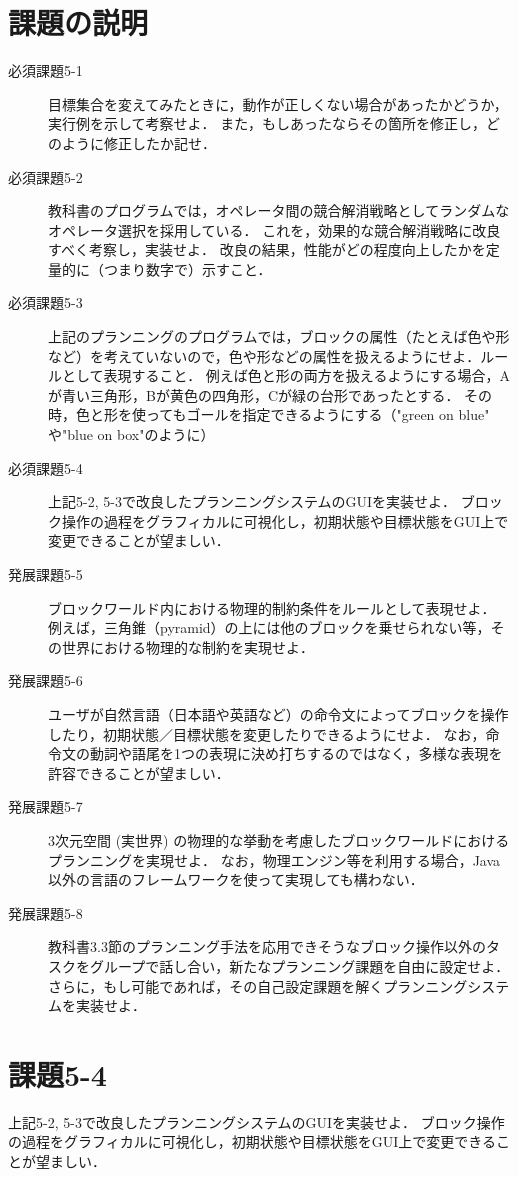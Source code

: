 \documentclass{jarticle}
\begin{document}
\section{課題の説明}
\begin{description}
    \item[必須課題5-1] 目標集合を変えてみたときに，動作が正しくない場合があったかどうか，実行例を示して考察せよ．
    また，もしあったならその箇所を修正し，どのように修正したか記せ．
    \item[必須課題5-2] 教科書のプログラムでは，オペレータ間の競合解消戦略としてランダムなオペレータ選択を採用している．
    これを，効果的な競合解消戦略に改良すべく考察し，実装せよ．
    改良の結果，性能がどの程度向上したかを定量的に（つまり数字で）示すこと．
    \item[必須課題5-3] 上記のプランニングのプログラムでは，ブロックの属性（たとえば色や形など）を考えていないので，色や形などの属性を扱えるようにせよ．ルールとして表現すること．
    例えば色と形の両方を扱えるようにする場合，Aが青い三角形，Bが黄色の四角形，Cが緑の台形であったとする．
    その時，色と形を使ってもゴールを指定できるようにする（"green on blue" や"blue on box"のように）
    \item[必須課題5-4] 上記5-2, 5-3で改良したプランニングシステムのGUIを実装せよ．
    ブロック操作の過程をグラフィカルに可視化し，初期状態や目標状態をGUI上で変更できることが望ましい．
    \item[発展課題5-5] ブロックワールド内における物理的制約条件をルールとして表現せよ．
    例えば，三角錐（pyramid）の上には他のブロックを乗せられない等，その世界における物理的な制約を実現せよ．
    \item[発展課題5-6] ユーザが自然言語（日本語や英語など）の命令文によってブロックを操作したり，初期状態／目標状態を変更したりできるようにせよ．
    なお，命令文の動詞や語尾を1つの表現に決め打ちするのではなく，多様な表現を許容できることが望ましい．
    \item[発展課題5-7] 3次元空間 (実世界) の物理的な挙動を考慮したブロックワールドにおけるプランニングを実現せよ．
    なお，物理エンジン等を利用する場合，Java以外の言語のフレームワークを使って実現しても構わない．
    \item[発展課題5-8] 教科書3.3節のプランニング手法を応用できそうなブロック操作以外のタスクをグループで話し合い，新たなプランニング課題を自由に設定せよ．
    さらに，もし可能であれば，その自己設定課題を解くプランニングシステムを実装せよ．    
\end{description}


\section{課題5-4}
\begin{screen}
    上記5-2, 5-3で改良したプランニングシステムのGUIを実装せよ．
    ブロック操作の過程をグラフィカルに可視化し，初期状態や目標状態をGUI上で変更できることが望ましい．
\end{screen}
\end{document}
